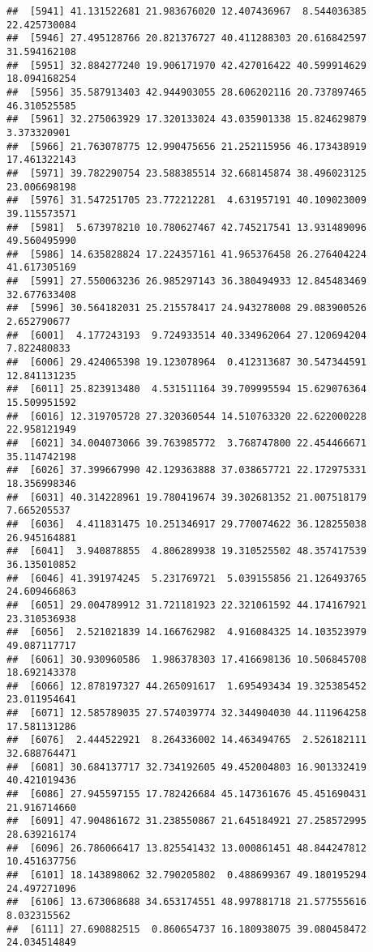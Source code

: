 \documentclass[
]{article}
\begin{document}
\begin{verbatim}
##  [5941] 41.131522681 21.983676020 12.407436967  8.544036385 22.425730084
##  [5946] 27.495128766 20.821376727 40.411288303 20.616842597 31.594162108
##  [5951] 32.884277240 19.906171970 42.427016422 40.599914629 18.094168254
##  [5956] 35.587913403 42.944903055 28.606202116 20.737897465 46.310525585
##  [5961] 32.275063929 17.320133024 43.035901338 15.824629879  3.373320901
##  [5966] 21.763078775 12.990475656 21.252115956 46.173438919 17.461322143
##  [5971] 39.782290754 23.588385514 32.668145874 38.496023125 23.006698198
##  [5976] 31.547251705 23.772212281  4.631957191 40.109023009 39.115573571
##  [5981]  5.673978210 10.780627467 42.745217541 13.931489096 49.560495990
##  [5986] 14.635828824 17.224357161 41.965376458 26.276404224 41.617305169
##  [5991] 27.550063236 26.985297143 36.380494933 12.845483469 32.677633408
##  [5996] 30.564182031 25.215578417 24.943278008 29.083900526  2.652790677
##  [6001]  4.177243193  9.724933514 40.334962064 27.120694204  7.822480833
##  [6006] 29.424065398 19.123078964  0.412313687 30.547344591 12.841131235
##  [6011] 25.823913480  4.531511164 39.709995594 15.629076364 15.509951592
##  [6016] 12.319705728 27.320360544 14.510763320 22.622000228 22.958121949
##  [6021] 34.004073066 39.763985772  3.768747800 22.454466671 35.114742198
##  [6026] 37.399667990 42.129363888 37.038657721 22.172975331 18.356998346
##  [6031] 40.314228961 19.780419674 39.302681352 21.007518179  7.665205537
##  [6036]  4.411831475 10.251346917 29.770074622 36.128255038 26.945164881
##  [6041]  3.940878855  4.806289938 19.310525502 48.357417539 36.135010852
##  [6046] 41.391974245  5.231769721  5.039155856 21.126493765 24.609466863
##  [6051] 29.004789912 31.721181923 22.321061592 44.174167921 23.310536938
##  [6056]  2.521021839 14.166762982  4.916084325 14.103523979 49.087117717
##  [6061] 30.930960586  1.986378303 17.416698136 10.506845708 18.692143378
##  [6066] 12.878197327 44.265091617  1.695493434 19.325385452 23.011954641
##  [6071] 12.585789035 27.574039774 32.344904030 44.111964258 17.581131286
##  [6076]  2.444522921  8.264336002 14.463494765  2.526182111 32.688764471
##  [6081] 30.684137717 32.734192605 49.452004803 16.901332419 40.421019436
##  [6086] 27.945597155 17.782426684 45.147361676 45.451690431 21.916714660
##  [6091] 47.904861672 31.238550867 21.645184921 27.258572995 28.639216174
##  [6096] 26.786066417 13.825541432 13.000861451 48.844247812 10.451637756
##  [6101] 18.143898062 32.790205802  0.488699367 49.180195294 24.497271096
##  [6106] 13.673068688 34.653174551 48.997881718 21.577555616  8.032315562
##  [6111] 27.690882515  0.860654737 16.180938075 39.080458472 24.034514849

\end{verbatim}
\end{document}
